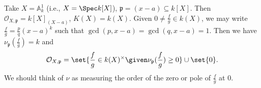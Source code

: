 Take $X = \mathbb{A}^1_k$ (i.e., $X = \Spec k[X]$), $\mathfrak{p} = (x - a) \subseteq k[X]$.
Then $\mathcal{O}_{X, \mathfrak{p}} = k[X]_{(X - a)}$, $K(X) = k(X)$. Given
$0\neq\frac{f}{g} \in k(X)$, we may write $\frac{f}{g} = \frac{p}{q}(x-a)^k$ such that
$\gcd(p, x-a) = \gcd(q, x-a)  =1$. Then we have $\nu_{\mathfrak{p}}(\frac{f}{g}) = k$ and
\[ \mathcal{O}_{X, \mathfrak{p}} = \set{\frac{f}{g} \in k(X)^\times\given \nu_{\mathfrak{p}}(\frac{f}{g})\geq 0} \cup\set{0}.\]
We should think of $\nu$ as measuring the order of the zero or pole of $\frac{f}{g}$ at $0$.
